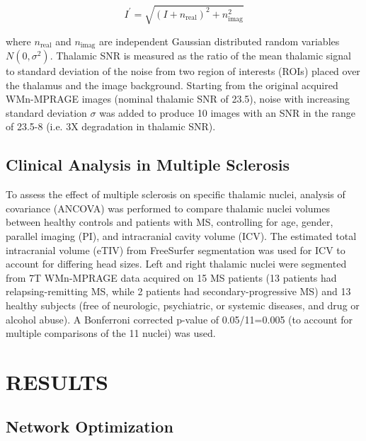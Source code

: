 \begin{equation}
\label{dThalamus.Eq.5.Iprime}
I^{'}=\sqrt{{\left(I+n_{\text{real}}\right)}^{2}+n_{\text{imag}}^{2}}
\end{equation}

where $n_{\text{real}} $ and $n_{\text{imag}} $ are independent Gaussian distributed random variables $N(0,\sigma ^{2})$. Thalamic SNR is measured as the ratio of the mean thalamic signal to standard deviation of the noise from two region of interests (ROIs) placed over the thalamus and the image background. Starting from the original acquired WMn-MPRAGE images (nominal thalamic SNR of 23.5), noise with increasing standard deviation $\sigma  $ was added to produce 10 images with an SNR in the range of 23.5-8 (i.e.  3X degradation in thalamic SNR).

\subsection{Clinical Analysis in Multiple Sclerosis}
To assess the effect of multiple sclerosis on specific thalamic nuclei, analysis of covariance (ANCOVA) was performed to compare thalamic nuclei volumes between healthy controls and patients with MS, controlling for age, gender, parallel imaging (PI), and intracranial cavity volume (ICV). The estimated total intracranial volume (eTIV) from FreeSurfer segmentation was used for ICV to account for differing head sizes. Left and right thalamic nuclei were segmented from 7T WMn-MPRAGE data acquired on 15 MS patients (13 patients had relapsing-remitting MS, while 2 patients had secondary-progressive MS) and 13 healthy subjects (free of neurologic, psychiatric, or systemic diseases, and drug or alcohol abuse). A Bonferroni corrected p-value of 0.05/11=0.005 (to account for multiple comparisons of the 11 nuclei) was used.

\section{RESULTS}

\subsection{Network Optimization}

